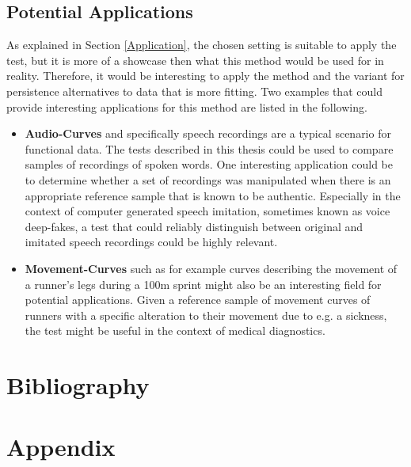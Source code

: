 \documentclass[12pt, a4paper]{article}
\theoremstyle{MAstyle} \newtheorem{assumption}{Assumption}[section]
\theoremstyle{MAstyle} \newtheorem{definition}{Definition}[section]
\theoremstyle{MAstyle} \newtheorem{theorem}{Theorem}[section]
\begin{document}
		\subsection{Potential Applications}\label{pot_appl}
			As explained in Section \ref{Application}, the chosen setting is suitable to apply the test, but it is more of a showcase then what this method would be used for in reality. Therefore, it would be interesting to apply the method and the variant for persistence alternatives to data that is more fitting. Two examples that could provide interesting applications for this method are listed in the following.
			\begin{itemize}
				\item \textbf{Audio-Curves} and specifically speech recordings are a typical scenario for functional data. The tests described in this thesis could be used to compare samples of recordings of spoken words. One interesting application could be to determine whether a set of recordings was manipulated when there is an appropriate reference sample that is known to be authentic. Especially in the context of computer generated speech imitation, sometimes known as voice deep-fakes, a test that could reliably distinguish between original and imitated speech recordings could be highly relevant.
				\item \textbf{Movement-Curves} such as for example curves describing the movement of a runner's legs during a 100m sprint might also be an interesting field for potential applications. Given a reference sample of movement curves of runners with a specific alteration to their movement due to e.g. a sickness, the test might be useful in the context of medical diagnostics.
			\end{itemize}
		
		
	
	\newpage
	\section{Bibliography}
	\printbibliography[heading=none]
	
	\newpage
	\cleardoublepage
	\setcounter{page}{1}
	\section{Appendix}
	
\end{document}
